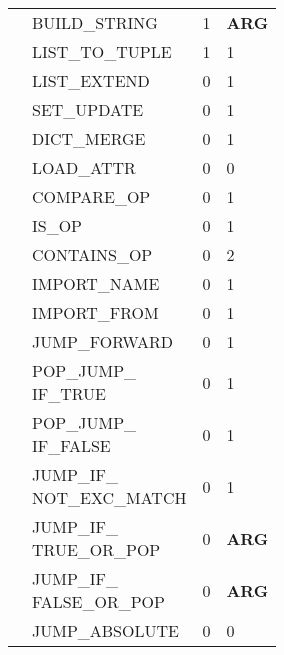 \begin{longtable}{|p{4cm}|p{4cm}|p{2cm}|p{2cm}|  }
    \cline{2-4} & 
    BUILD\_STRING&1&{\bfseries ARG}\\
 
    \cline{2-4} & 
    LIST\_TO\_TUPLE&1&1\\
    
    \cline{2-4} & 
    LIST\_EXTEND&0&1\\
    
    \cline{2-4} & 
    SET\_UPDATE&0&1\\
    
    \cline{2-4} & 
    DICT\_MERGE&0&1\\
    
    \cline{2-4} & 
    LOAD\_ATTR&0&0\\
    
    \cline{2-4} & 
    COMPARE\_OP&0&1\\
    
    \cline{2-4} & 
    IS\_OP&0&1\\
    
    \cline{2-4} & 
    CONTAINS\_OP&0&2\\
    
    \cline{2-4} & 
    IMPORT\_NAME&0&1\\
    
    \cline{2-4} & 
    IMPORT\_FROM&0&1\\

    \cline{2-4} & 
    JUMP\_FORWARD&0&1\\
    
    \cline{2-4} & 
    \makecell{POP\_JUMP\_ \\ IF\_TRUE}&0&1\\
    
    \cline{2-4} & 
    \makecell{POP\_JUMP\_ \\ IF\_FALSE}&0&1\\
    
    \cline{2-4} & 
    \makecell{JUMP\_IF\_ \\ NOT\_EXC\_MATCH}&0&1\\
  
    \cline{2-4} & 
    \makecell{JUMP\_IF\_ \\ TRUE\_OR\_POP}&0&{\bfseries ARG}\\
    
    \cline{2-4} & 
    \makecell{JUMP\_IF\_ \\ FALSE\_OR\_POP}&0&{\bfseries ARG}\\

    \cline{2-4} & 
    JUMP\_ABSOLUTE&0&0\\
    

\end{longtable}
